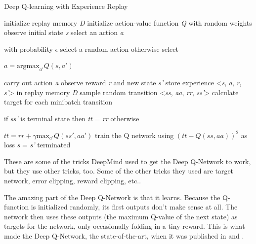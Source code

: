 \begin{algorithm}
	\caption{Deep Q-learning with Experience Replay}
	\label{algo:DQN}
	\begin{algorithmic}[]
		\State initialize replay memory \textit{D}
		\State initialize action-value function \textit{Q} with random weights
		\State observe initial state \textit{s} 
		\Repeat
			\State select an action \textit{a}
				\par with probability $\epsilon$ select a random action otherwise select 
				\par $a = \mathrm{argmax}_{a'}Q(s,a')$
		
			\State carry out action \textit{a}
			\State observe reward \textit{r} and new state \textit{s'}
			\State store experience <\textit{s}, \textit{a}, \textit{r}, \textit{s'}> in replay memory \textit{D}
			\newline
			\State sample random transition <\textit{ss}, \textit{aa}, \textit{rr}, \textit{ss'}>      
			\State calculate target for each minibatch transition
				\par if \textit{ss'} is terminal state then \textit{tt} = \textit{rr} otherwise 
				\par $tt = rr + \gamma \mathrm{max}_{a'}Q(ss',aa')$
			\State train the Q network using $(\textit{tt} - Q(\textit{ss}, \textit{aa}))^2$ as loss	
			\newline
			\State \textit{s} = \textit{s'}
		\Until terminated
	\end{algorithmic}
\end{algorithm}

These are some of the tricks DeepMind used to get the Deep Q-Network to work, but they use other tricks, too. Some of the other tricks they used are target network, error clipping, reward clipping, etc.. 

The amazing part of the Deep Q-Network is that it learns. Because the Q-function is initialized randomly, its first outputs don't make sense at all. The network then uses these outputs (the maximum Q-value of the next state) as targets for the network, only occasionally folding in a tiny reward. This is what made the Deep Q-Network, the state-of-the-art, when it was published in \cite{DQN_theory} and \cite{DQN_Flappy}.
        